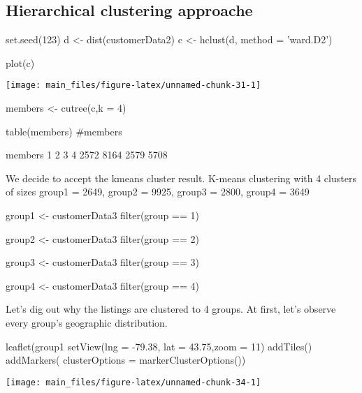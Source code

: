 \hypertarget{hierarchical-clustering-approache}{%
\subsection{Hierarchical clustering
approache}\label{hierarchical-clustering-approache}}

\begin{Schunk}
\begin{Sinput}
set.seed(123)
d <- dist(customerData2)
c <- hclust(d, method = 'ward.D2')

plot(c)
\end{Sinput}


\begin{center}\texttt{[image: main\_files/figure-latex/unnamed-chunk-31-1]} \end{center}

\end{Schunk}

\begin{Schunk}
\begin{Sinput}
members <- cutree(c,k = 4)

table(members)
#members
\end{Sinput}
\begin{Soutput}
members
   1    2    3    4 
2572 8164 2579 5708 
\end{Soutput}
\end{Schunk}

We decide to accept the kmeans cluster result. K-means clustering with 4
clusters of sizes group1 = 2649, group2 = 9925, group3 = 2800, group4 =
3649

\begin{Schunk}
\begin{Sinput}
group1 <- customerData3 %>% 
  filter(group == 1)

group2 <- customerData3 %>% 
  filter(group == 2)

group3 <- customerData3 %>% 
  filter(group == 3)

group4 <- customerData3 %>% 
  filter(group == 4)
\end{Sinput}
\end{Schunk}

Let's dig out why the listings are clustered to 4 groups. At first,
let's observe every group's geographic distribution.

\begin{Schunk}
\begin{Sinput}
leaflet(group1 %>% select(longitude,latitude)) %>%
  setView(lng = -79.38, lat = 43.75,zoom = 11) %>%
   addTiles() %>% 
  addMarkers(
  clusterOptions = markerClusterOptions())
\end{Sinput}


\begin{center}\texttt{[image: main\_files/figure-latex/unnamed-chunk-34-1]} \end{center}

\end{Schunk}

